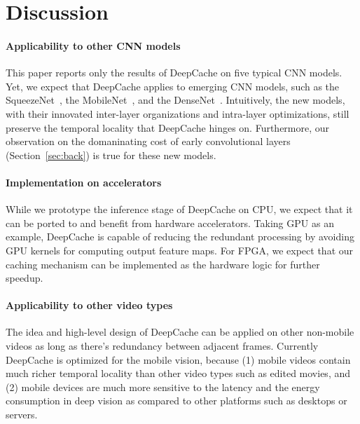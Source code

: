 \documentclass[10pt,acmtog]{acmart}
\newcommand{\framework}{DeepCache\xspace}
\newcommand{\sys}{\framework{}}
\newcommand{\revise}[1]{{#1}}
\begin{document}
\section{Discussion}\label{sec:discuss}\revise{



\paragraph{Applicability to other CNN models}
This paper reports only the results of \framework on five typical CNN models.
Yet, we expect that \framework{} applies to emerging CNN models, such as the SqueezeNet~\cite{squeezenet}, the MobileNet~\cite{MobileNet}, and the DenseNet~\cite{huang2017densely}. 
Intuitively, the new models, with their innovated inter-layer organizations and intra-layer optimizations, still preserve the temporal locality that \framework hinges on.
Furthermore, our observation on the domaninating cost of early convolutional layers (Section~\ref{sec:back}) is true for these new models.

\paragraph{Implementation on accelerators}
While we prototype the inference stage of \framework{} on CPU, we expect that it can be ported to and benefit from hardware accelerators. 
Taking GPU as an example, \framework{} is capable of reducing the redundant processing by avoiding GPU kernels for computing output feature maps. 
For FPGA, we expect that our caching mechanism can be implemented as the hardware logic for further speedup. 

\paragraph{Applicability to other video types}
The idea and high-level design of \sys{} can be applied on other non-mobile videos as long as there's redundancy between adjacent frames. Currently \sys{} is optimized for the mobile vision, because (1) mobile videos contain much richer temporal locality than other video types such as edited movies, and (2) mobile devices are much more sensitive to the latency and the energy consumption in deep vision as compared to other platforms such as desktops or servers.

}%
\end{document}
